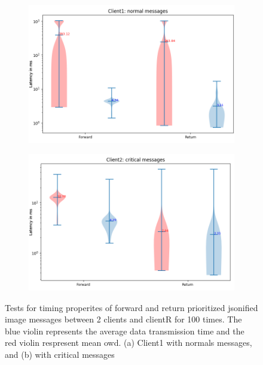 \begin{figure}[h]
    \centering
    \begin{subfigure}[b]{0.6\textwidth}
    \includegraphics[width=\textwidth]{figures/appendix/priority_tests/log_violin_2clients_image_priority_client1.png}\hfill 
    \caption{} \label{fig: priority-2clients-image-1}
    \end{subfigure}
    \begin{subfigure}[b]{0.6\textwidth}
        \includegraphics[width=\textwidth]{figures/appendix/priority_tests/log_violin_2clients_image_priority_client2.png}\hfill 
        \caption{} \label{fig: priority-2clients-image-2}
    \end{subfigure}
    
    
    \caption{Tests for timing properites of forward and return prioritized jsonified image messages between 2 clients 
    and clientR for 100 times. The blue violin represents the average data transmission time and the red violin 
    respresent mean \gls{owd}. (a) Client1 with normals messages, and (b) 
    with critical messages} \label{fig: priority-2clients-image}
\end{figure}



